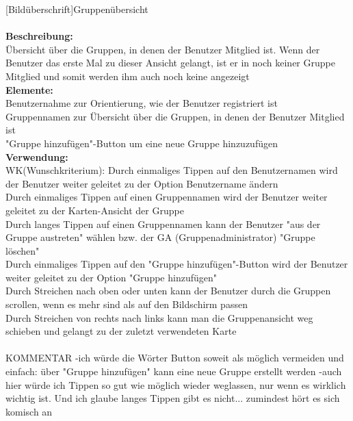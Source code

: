 [Bildüberschrift]Gruppenübersicht\\ \\
\textbf{Beschreibung:}\\
Übersicht über die Gruppen, in denen der Benutzer Mitglied ist. Wenn der Benutzer das erste Mal zu dieser Ansicht gelangt, ist er in noch keiner Gruppe Mitglied und somit werden ihm auch noch keine angezeigt\\
\textbf{Elemente:}\\
Benutzernahme zur Orientierung, wie der Benutzer registriert ist\\
Gruppennamen zur Übersicht über die Gruppen, in denen der Benutzer Mitglied ist\\
"Gruppe hinzufügen"-Button um eine neue Gruppe hinzuzufügen\\
\textbf{Verwendung:}\\
WK(Wunschkriterium): Durch einmaliges Tippen auf den Benutzernamen wird der Benutzer weiter geleitet zu der Option Benutzername ändern\\
Durch einmaliges Tippen auf einen Gruppennamen wird der Benutzer weiter geleitet zu der Karten-Ansicht der Gruppe\\
Durch langes Tippen auf einen Gruppennamen kann der Benutzer "aus der Gruppe austreten" wählen bzw. der GA (Gruppenadministrator) "Gruppe löschen"\\
Durch einmaliges Tippen auf den "Gruppe hinzufügen"-Button wird der Benutzer weiter geleitet zu der Option "Gruppe hinzufügen"\\
Durch Streichen nach oben oder unten kann der Benutzer durch die Gruppen scrollen, wenn es mehr sind als auf den Bildschirm passen\\
Durch Streichen von rechts nach links kann man die Gruppenansicht weg schieben und gelangt zu der zuletzt verwendeten Karte\\ \\

KOMMENTAR
-ich würde die Wörter Button soweit als möglich vermeiden und einfach: über "Gruppe hinzufügen" kann eine neue Gruppe erstellt werden
-auch hier würde ich Tippen so gut wie möglich wieder weglassen, nur wenn es wirklich wichtig ist. Und ich glaube langes Tippen gibt es nicht... zumindest hört es sich komisch an


